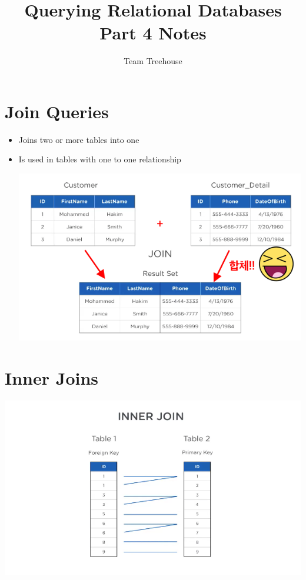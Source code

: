 \documentclass[12pt]{article}
\begin{document}
\title{Querying Relational Databases Part 4 Notes}
\author{Team Treehouse}
\maketitle

\bigskip

\section{Join Queries}

\bigskip

\begin{itemize}
    \item Joins two or more tables into one
    \item Is used in tables with one to one relationship

    \begin{center}
    \includegraphics[width=0.8\linewidth]{images/part_4_notes_1.png}
    \end{center}
\end{itemize}

\bigskip

\section{Inner Joins}

\begin{center}
\includegraphics[width=\linewidth]{images/part_4_notes_3.png}
\end{center}
\end{document}
